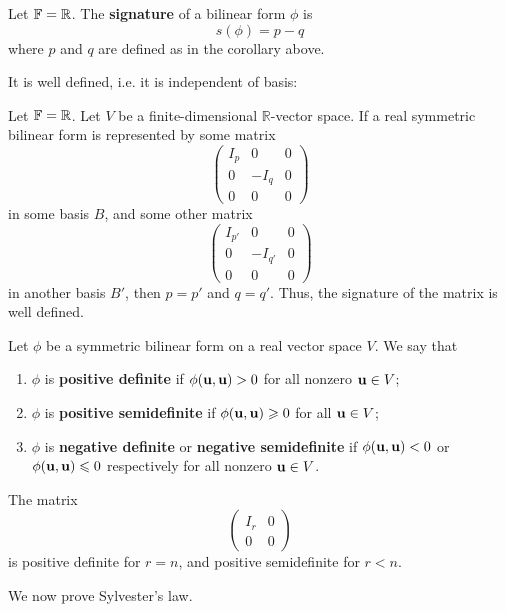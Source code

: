 \documentclass[a4paper,11pt]{article}
\begin{document}
\begin{definition}
	Let \( {\mathbb{F}} = \mathbb R \).
	The \textbf{signature} of a bilinear form \( \phi \) is
	\[
		s(\phi) = p - q
	\]
	where \( p \) and \( q \) are defined as in the corollary above.
\end{definition}
It is well defined, i.e. it is independent of basis:
\begin{theorem}
	Let \( {\mathbb{F}} = \mathbb R \).
	Let \( V \) be a finite-dimensional \( \mathbb R \)-vector space.
	If a real symmetric bilinear form is represented by some matrix
	\[
		\begin{pmatrix}
			I_p & 0    & 0 \\
			0   & -I_q & 0 \\
			0   & 0    & 0
		\end{pmatrix}
	\]
	in some basis \( B \), and some other matrix
	\[
		\begin{pmatrix}
			I_{p'} & 0       & 0 \\
			0      & -I_{q'} & 0 \\
			0      & 0       & 0
		\end{pmatrix}
	\]
	in another basis \( B' \), then \( p = p' \) and \( q = q' \).
	Thus, the signature of the matrix is well defined.
\end{theorem}
\begin{definition}
	Let \( \phi \) be a symmetric bilinear form on a real vector space \( V \).
	We say that
	\begin{enumerate}
		\item \( \phi \) is \textbf{positive definite} if \( \phi({\bf u},{\bf u}) > 0 \) for all nonzero \( {\bf u} \in V \);
		\item \( \phi \) is \textbf{positive semidefinite} if \( \phi({\bf u},{\bf u}) \geqslant 0 \) for all \( {\bf u} \in V \);
		\item \( \phi \) is \textbf{negative definite} or \textbf{negative semidefinite} if \( \phi({\bf u},{\bf u}) < 0 \) or \( \phi({\bf u},{\bf u}) \leqslant 0 \) respectively for all nonzero \( {\bf u} \in V \).
	\end{enumerate}
\end{definition}
\begin{example}
	The matrix
	\[
		\begin{pmatrix}
			I_r & 0 \\
			0   & 0
		\end{pmatrix}
	\]
	is positive definite for \( r = n \), and positive semidefinite for \( r < n \).
\end{example}
\noindent We now prove Sylvester's law.
\end{document}
